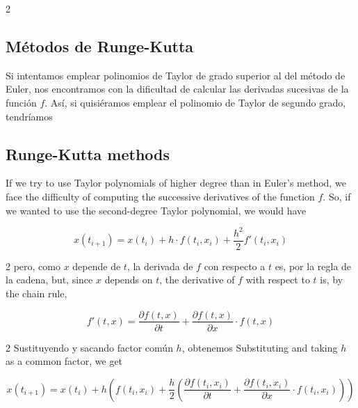 \begin{paracol}{2}

\subsection{Métodos de Runge-Kutta} 
Si intentamos emplear polinomios de Taylor de grado superior al del método de Euler, nos encontramos con la dificultad de calcular las derivadas sucesivas de la función $f$. Así, si quisiéramos emplear el polinomio de Taylor de segundo grado, tendríamos

\switchcolumn
\subsection{Runge-Kutta methods}
If we try to use Taylor polynomials of higher degree than in Euler's method, we face the difficulty of computing the successive derivatives of the function $f$. So, if we wanted to use the second-degree Taylor polynomial, we would have
\end{paracol}
\begin{equation*}
x(t_{i+1})=x(t_i)+h\cdot f(t_i,x_i)+\frac{h^2}{2}f'(t_i,x_i)
\end{equation*}
\begin{paracol}{2}
pero, como $x$ depende de $t$, la derivada de $f$ con respecto a $t$ es, por la regla de la cadena,
\switchcolumn
but, since $x$ depends on $t$, the derivative of $f$ with respect to $t$ is, by the chain rule,
\end{paracol}
\begin{equation*}
f'(t,x)=\frac{\partial f(t,x)}{\partial t}+\frac{\partial f(t,x)}{\partial x}\cdot f(t,x)
\end{equation*}
\begin{paracol}{2}
Sustituyendo y sacando factor común $h$, obtenemos
\switchcolumn
Substituting and taking $h$ as a common factor, we get
\end{paracol}
\begin{equation*}
x(t_{i+1})=x(t_i)+h\left(f(t_i,x_i)+\frac{h}{2}\left(\frac{\partial f(t_i,x_i)}{\partial t}+\frac{\partial f(t_i,x_i)}{\partial x}\cdot f(t_i,x_i)\right)\right)
\end{equation*}
